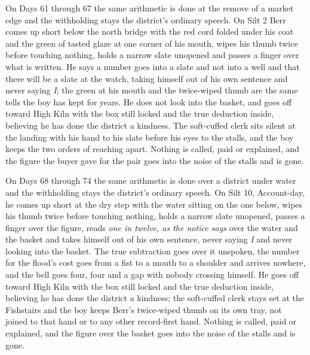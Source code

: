 \documentclass{design/chronicle}
\begin{document}
{On Days 61 through 67 the same arithmetic is done at the remove of a market edge and the withholding stays the district’s ordinary speech. On Silt 2 Berr comes up short below the north bridge with the red cord folded under his coat and the green of tasted glaze at one corner of his mouth, wipes his thumb twice before touching nothing, holds a narrow slate unopened and passes a finger over what is written. He says a number goes into a slate and not into a well and that there will be a slate at the watch, taking himself out of his own sentence and never saying \emph{I}; the green at his mouth and the twice-wiped thumb are the same tells the boy has kept for years. He does not look into the basket, and goes off toward High Kiln with the box still locked and the true deduction inside, believing he has done the district a kindness. The soft-cuffed clerk sits silent at the landing with his hand to his slate before his eyes to the stalls, and the boy keeps the two orders of reaching apart. Nothing is called, paid or explained, and the figure the buyer gave for the pair goes into the noise of the stalls and is gone.

On Days 68 through 74 the same arithmetic is done over a district under water and the withholding stays the district’s ordinary speech. On Silt 10, Account-day, he comes up short at the dry step with the water sitting on the one below, wipes his thumb twice before touching nothing, holds a narrow slate unopened, passes a finger over the figure, reads \emph{one in twelve, as the notice says} over the water and the basket and takes himself out of his own sentence, never saying \emph{I} and never looking into the basket. The true subtraction goes over it unspoken, the number for the flood’s cost goes from a fist to a mouth to a shoulder and arrives nowhere, and the bell goes four, four and a gap with nobody crossing himself. He goes off toward High Kiln with the box still locked and the true deduction inside, believing he has done the district a kindness; the soft-cuffed clerk stays set at the Fishstairs and the boy keeps Berr’s twice-wiped thumb on its own tray, not joined to that hand or to any other record-first hand. Nothing is called, paid or explained, and the figure over the basket goes into the noise of the stalls and is gone.

}
\end{document}
